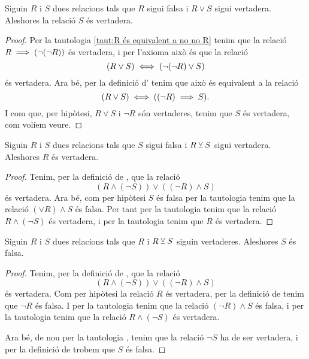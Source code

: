 \documentclass[../../Main.tex]{subfiles}
\begin{document}
	\begin{tautology}
		\label{taut:condicions per disjunció}
		Siguin \(R\) i \(S\) dues relacions tals que \(R\) sigui falsa i \(R\lor S\) sigui vertadera. Aleshores la relació \(S\) és vertadera.
		\begin{proof}
			Per la tautologia \ref{taut:R és equivalent a no no R} tenim que la relació \(R\implies(\lnot(\lnot R))\) és vertadera, i per l'axioma  això és que la relació
			\[(R\lor S)\iff(\lnot(\lnot R)\lor S)\]
			és vertadera. Ara bé, per la definició d' tenim que això és equivalent a la relació
			\[(R\lor S)\iff((\lnot R)\implies S).\]
			I com que, per hipòtesi, \(R\lor S\) i \(\lnot R\) són vertaderes, tenim que \(S\) és vertadera, com volíem veure.
		\end{proof}
	\end{tautology}
	\begin{tautology}
		\label{taut:disjunció excloent 1}
		Siguin \(R\) i \(S\) dues relacions tals que \(S\) sigui falsa i \(R\mathbin{\veebar} S\) sigui vertadera. Aleshores \(R\) és vertadera.
		\begin{proof}
			Tenim, per la definició de , que la relació
			\[(R\land(\lnot S))\lor((\lnot R)\land S)\]
			és vertadera. Ara bé, com per hipòtesi \(S\) és falsa per la tautologia  tenim que la relació \((\lor R)\land S\) és falsa. Per tant per la tautologia  tenim que la relació \(R\land(\lnot S)\) és vertadera, i per la tautologia  tenim que \(R\) és vertadera.
		\end{proof}
	\end{tautology}
	\begin{tautology}
		\label{taut:disjunció excloent 2}
		Siguin \(R\) i \(S\) dues relacions tals que \(R\) i \(R\mathbin{\veebar} S\) siguin vertaderes. Aleshores \(S\) és falsa.
		\begin{proof}
			Tenim, per la definició de , que la relació
			\[(R\land(\lnot S))\lor((\lnot R)\land S)\]
			és vertadera. Com per hipòtesi la relació \(R\) és vertadera, per la definició de  tenim que \(\lnot R\) és falsa. I per la tautologia  tenim que la relació \((\lnot R)\land S\) és falsa, i per la tautologia  tenim que la relació \(R\land(\lnot S)\) és vertadera.
			
			Ara bé, de nou per la tautologia , tenim que la relació \(\lnot S\) ha de ser vertadera, i per la definició de  trobem que \(S\) és falsa.
		\end{proof}
	\end{tautology}
\end{document}
